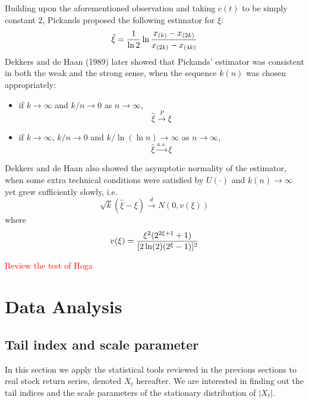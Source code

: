 \documentclass{article}
\newcommand{\1}[1]{
  \mathbf{1}_{\{#1\}}
}
\begin{document}
Building upon the aforementioned observation and taking $c(t)$ to
be simply constant 2, Pickands proposed the following estimator for
$\xi$:
\[
\hat \xi = {1 \over \ln 2} \ln {
  x_{(k)} - x_{(2k)}
  \over
  x_{(2k)} - x_{(4k)}
}
\]
Dekkers and de Haan (1989) later showed \cite{dekkers1989estimation}
that Pickands' estimator was consistent in both the weak and the strong
sense, when the sequence $k(n)$ was chosen appropriately:
\begin{itemize}
\item if $k \to \infty$ and $k/n \to 0$ as $n \to \infty$,
  \[
  \hat \xi \overset{P}{\to} \xi
  \]
\item if $k \to \infty$, $k/n \to 0$ and $k / \ln(\ln n) \to \infty$
  as $n \to \infty$,
  \[
  \hat \xi \overset{a.s.}{\to} \xi
  \]
\end{itemize}
Dekkers and de Haan \cite{dekkers1989estimation} also showed the
asymptotic normality of the estimator, when some
extra technical conditions were satisfied by
$U(\cdot)$ and $k(n) \to \infty$ yet grew sufficiently slowly, i.e.
\[
\sqrt k (\hat \xi - \xi) \overset{d}{\to} N(0, v(\xi))
\]
where
\[
v(\xi) = {
  \xi^2 (2^{2 \xi + 1} + 1)
  \over
  [2 \ln(2) (2^\xi - 1)]^2
}
\]



\textcolor{red}{Review the test of Hoga}

\section{Data Analysis} \label{sec:data_analysis}
\subsection{Tail index and scale parameter}
In this section we apply the statistical tools reviewed in the
previous sections to real stock return series, denoted $X_t$
hereafter. We are interested in finding out the tail indices and the
scale parameters of the stationary distribution of $|X_t|$.
\end{document}
